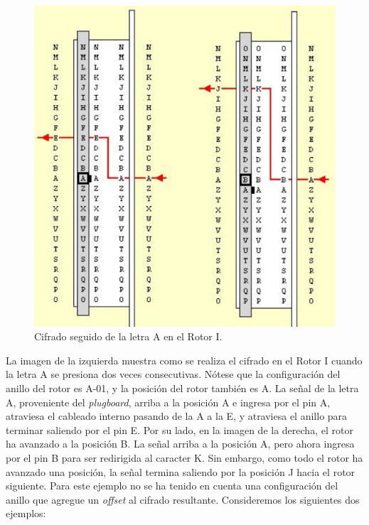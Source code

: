 \documentclass[a4paper,10pt]{article}
\begin{document}
\begin{figure}[H]
    \centering
    \includegraphics[scale=0.4]{rotor-ejs-1.png}
    \caption{Cifrado seguido de la letra A en el Rotor I.\cite{rijmenants}}
    \label{fig:my_label}
\end{figure}

La imagen de la izquierda muestra como se realiza el cifrado en el Rotor I cuando la letra A se presiona dos veces consecutivas. Nótese que la configuración del anillo del rotor es A-01, y la posición del rotor también es A. La señal de la letra A, proveniente del \textit{plugboard}, arriba a la posición A e ingresa por el pin A, atraviesa el cableado interno pasando de la A a la E, y atraviesa el anillo para terminar saliendo por el pin E.
Por su lado, en la imagen de la derecha, el rotor ha avanzado a la posición B. La señal arriba a la posición A, pero ahora ingresa por el pin B para ser redirigida al caracter K. Sin embargo, como todo el rotor ha avanzado una posición, la señal termina saliendo por la posición J hacia el rotor siguiente.
Para este ejemplo no se ha tenido en cuenta una configuración del anillo que agregue un \textit{offset} al cifrado resultante. Consideremos los siguientes dos ejemplos: 
\end{document}

